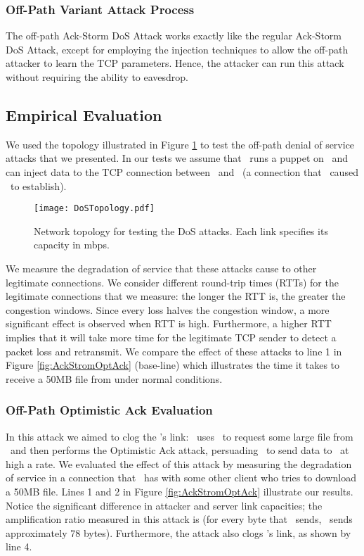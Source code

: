 \documentclass[conference]{IEEEtran}
\newcommand{\fullppr}[1]{}
\begin{document}
\subsubsection{Off-Path Variant Attack Process}
The off-path Ack-Storm DoS Attack works exactly like the regular Ack-Storm DoS Attack, except for employing the injection techniques to allow the off-path attacker to learn the TCP parameters. Hence, the attacker can run this attack without requiring the ability to eavesdrop. 

\subsection{Empirical Evaluation}
We used the topology illustrated in Figure \ref{fig:dosmodel} to test the off-path denial of service attacks that we presented. In our tests we assume that \mal\ runs a puppet on \wini\ and can inject data to the TCP connection between \wini\ and \lin\ (a connection that \mal\ caused \wini\ to establish).

\begin{figure}
  \begin{center}
    \texttt{[image: DoSTopology.pdf]}
  \end{center}
  \caption{Network topology for testing the DoS attacks. Each link specifies its capacity in mbps.}
  \label{fig:dosmodel}
\end{figure}

We measure the degradation of service that these attacks cause to other legitimate connections. We consider different round-trip times (RTTs) for the legitimate connections that we measure: the longer the RTT is, the greater the congestion windows. Since every loss halves the congestion window, a more significant effect is observed when RTT is high. Furthermore, a higher RTT implies that it will take more time for the legitimate TCP sender to detect a packet loss and retransmit. We compare the effect of these attacks to line 1 in Figure \ref{fig:AckStromOptAck} (base-line) which illustrates the time it takes \wini* to receive a 50MB file from \lin* under normal conditions.

\subsubsection{Off-Path Optimistic Ack Evaluation}
In this attack we aimed to clog the \lin's link: \mal\ uses \wini\ to request some large file from \lin\ and then performs the Optimistic Ack attack, persuading \lin\ to send data to \wini\ at high a rate. We evaluated the effect of this attack by measuring the degradation of service in a connection that \lin\ has with some other client \wini* who tries to download a 50MB file\fullppr{ (see network topology in Figure \ref{fig:dosmodel})}. Lines 1 and 2 in Figure \ref{fig:AckStromOptAck} illustrate our results. Notice the significant difference in attacker and server link capacities; the amplification ratio measured in this attack is  (for every byte that \mal\ sends, \lin\ sends approximately 78 bytes). Furthermore, the attack also clogs \wini's link, as shown by line 4.
\end{document}
